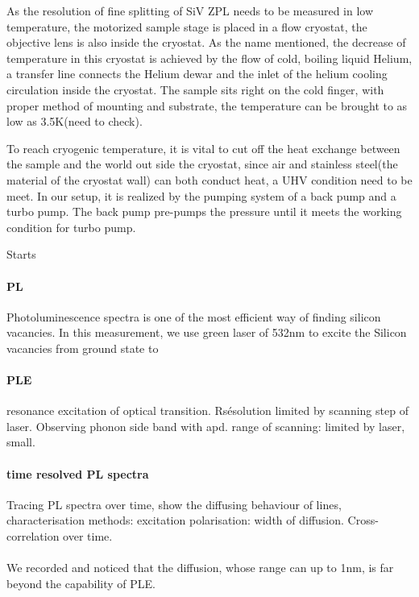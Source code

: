 As the resolution of fine splitting of SiV ZPL needs to be measured in low temperature, the motorized sample stage is placed in a flow cryostat, the objective lens is also inside the cryostat. As the name mentioned, the decrease of temperature in this cryostat is achieved by the flow of cold, boiling liquid Helium, a transfer line connects the Helium dewar and the inlet of the helium cooling circulation inside the cryostat. The sample sits right on the cold finger, with proper method of mounting and substrate, the temperature can be brought to as low as 3.5K(need to check).

To reach cryogenic temperature, it is vital to cut off the heat exchange between the sample and the world out side the cryostat, since air and stainless steel(the material of the cryostat wall) can both conduct heat, a UHV condition need to be meet. In our setup, it is realized by the pumping system of a back pump and a turbo pump. The back pump pre-pumps the pressure until it meets the working condition for turbo pump.

Starts


\paragraph{PL} Photoluminescence spectra is one of the most efficient way of finding silicon vacancies. In this measurement, we use green laser of 532nm to excite the Silicon vacancies from ground state to 

\paragraph{PLE} resonance excitation of optical transition. Rsésolution limited by scanning step of laser. Observing phonon side band with apd. range of scanning: limited by laser, small.

\paragraph{time resolved PL spectra} Tracing PL spectra over time, show the diffusing behaviour of lines, characterisation methods: excitation polarisation: width of diffusion. Cross- correlation over time.
\paragraph{}We recorded and noticed that the diffusion, whose range can up to 1nm, is far beyond the capability of PLE. 